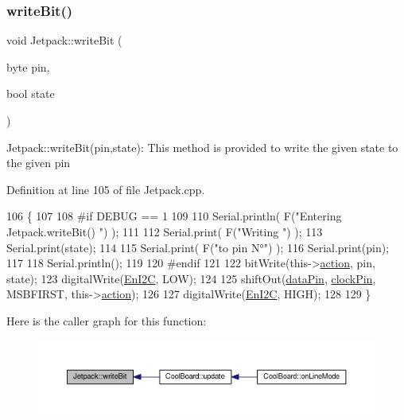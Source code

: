 \subsubsection{\texorpdfstring{write\+Bit()}{writeBit()}}
{\footnotesize\ttfamily void Jetpack\+::write\+Bit (\begin{DoxyParamCaption}\item[{byte}]{pin,  }\item[{bool}]{state }\end{DoxyParamCaption})}

Jetpack\+::write\+Bit(pin,state)\+: This method is provided to write the given state to the given pin 

Definition at line 105 of file Jetpack.\+cpp.


\begin{DoxyCode}
106 \{
107 
108 \textcolor{preprocessor}{#if DEBUG == 1 }
109 
110     Serial.println( F(\textcolor{stringliteral}{"Entering Jetpack.writeBit() "}) );
111 
112     Serial.print( F(\textcolor{stringliteral}{"Writing "}) );
113     Serial.print(state);
114 
115     Serial.print( F(\textcolor{stringliteral}{"to pin N°"}) );
116     Serial.print(pin);
117 
118     Serial.println();
119 
120 \textcolor{preprocessor}{#endif}
121 
122     bitWrite(this->\hyperlink{class_jetpack_aca3142925a7b0834b34ae91d26af7765}{action}, pin, state);
123     digitalWrite(\hyperlink{class_jetpack_a81df984fb4cea98c71aa1a1cfcdfe814}{EnI2C}, LOW);
124     
125     shiftOut(\hyperlink{class_jetpack_a3d669a56e93c71dd25f970d4ed7d0c00}{dataPin}, \hyperlink{class_jetpack_a58ebb991f358f3ae94e82148b0221b5a}{clockPin}, MSBFIRST, this->\hyperlink{class_jetpack_aca3142925a7b0834b34ae91d26af7765}{action});
126 
127     digitalWrite(\hyperlink{class_jetpack_a81df984fb4cea98c71aa1a1cfcdfe814}{EnI2C}, HIGH);
128 
129 \}
\end{DoxyCode}
Here is the caller graph for this function\+:
\nopagebreak
\begin{figure}[H]
\begin{center}
\leavevmode
\includegraphics[width=350pt]{df/d1d/class_jetpack_a79ae7bc3c1828a0551a7c005c4f8bd00_icgraph}
\end{center}
\end{figure}



